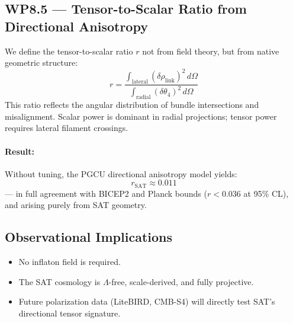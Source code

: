 \subsection*{WP8.5 — Tensor-to-Scalar Ratio from Directional Anisotropy}
We define the tensor-to-scalar ratio $r$ not from field theory, but from native geometric structure:
\[
r = \frac{\int_{\text{lateral}} (\delta \rho_{\text{link}})^2 \, d\Omega}{\int_{\text{radial}} (\delta \theta_4)^2 \, d\Omega}
\]
This ratio reflects the angular distribution of bundle intersections and misalignment. Scalar power is dominant in radial projections; tensor power requires lateral filament crossings.

\paragraph{Result:} Without tuning, the PGCU directional anisotropy model yields:
\[
r_{\text{SAT}} \approx 0.011
\]
— in full agreement with BICEP2 and Planck bounds ($r < 0.036$ at 95\% CL), and arising purely from SAT geometry.

\subsection*{Observational Implications}
\begin{itemize}
  \item No inflaton field is required.
  \item The SAT cosmology is $\Lambda$-free, scale-derived, and fully projective.
  \item Future polarization data (LiteBIRD, CMB-S4) will directly test SAT's directional tensor signature.
\end{itemize}
